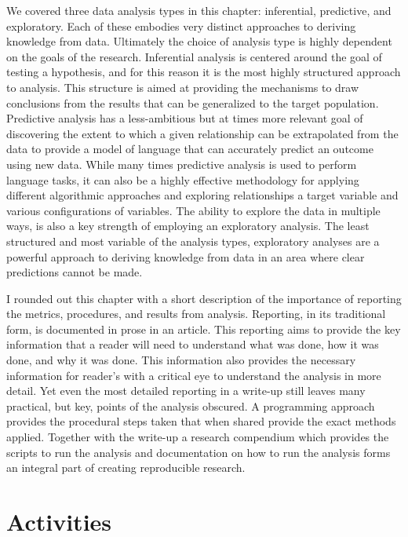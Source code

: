 \documentclass[
  letterpaper,
]{latex/krantz}
\begin{document}
We covered three data analysis types in this chapter: inferential,
predictive, and exploratory. Each of these embodies very distinct
approaches to deriving knowledge from data. Ultimately the choice of
analysis type is highly dependent on the goals of the research.
Inferential analysis is centered around the goal of testing a
hypothesis, and for this reason it is the most highly structured
approach to analysis. This structure is aimed at providing the
mechanisms to draw conclusions from the results that can be generalized
to the target population. Predictive analysis has a less-ambitious but
at times more relevant goal of discovering the extent to which a given
relationship can be extrapolated from the data to provide a model of
language that can accurately predict an outcome using new data. While
many times predictive analysis is used to perform language tasks, it can
also be a highly effective methodology for applying different
algorithmic approaches and exploring relationships a target variable and
various configurations of variables. The ability to explore the data in
multiple ways, is also a key strength of employing an exploratory
analysis. The least structured and most variable of the analysis types,
exploratory analyses are a powerful approach to deriving knowledge from
data in an area where clear predictions cannot be made.

I rounded out this chapter with a short description of the importance of
reporting the metrics, procedures, and results from analysis. Reporting,
in its traditional form, is documented in prose in an article. This
reporting aims to provide the key information that a reader will need to
understand what was done, how it was done, and why it was done. This
information also provides the necessary information for reader's with a
critical eye to understand the analysis in more detail. Yet even the
most detailed reporting in a write-up still leaves many practical, but
key, points of the analysis obscured. A programming approach provides
the procedural steps taken that when shared provide the exact methods
applied. Together with the write-up a research compendium which provides
the scripts to run the analysis and documentation on how to run the
analysis forms an integral part of creating reproducible research.

\hypertarget{activities-2}{%
\section*{Activities}\label{activities-2}}
\end{document}
